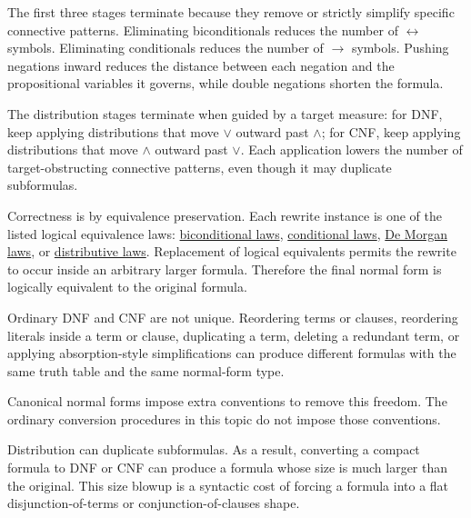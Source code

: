\begin{remark*}[Termination]
The first three stages terminate because they remove or strictly simplify
specific connective patterns. Eliminating biconditionals reduces the number of
\(\leftrightarrow\) symbols. Eliminating conditionals reduces the number of
\(\rightarrow\) symbols. Pushing negations inward reduces the distance between
each negation and the propositional variables it governs, while double
negations shorten the formula.

The distribution stages terminate when guided by a target measure: for DNF,
keep applying distributions that move \(\lor\) outward past \(\land\); for CNF,
keep applying distributions that move \(\land\) outward past \(\lor\). Each
application lowers the number of target-obstructing connective patterns, even
though it may duplicate subformulas.
\end{remark*}

\begin{remark*}[Correctness]
Correctness is by equivalence preservation. Each rewrite instance is one of the
listed logical equivalence laws:
\hyperref[thm:biconditional-equivalence-laws-propositional-logic]{biconditional laws},
\hyperref[thm:conditional-equivalence-laws-propositional-logic]{conditional laws},
\hyperref[thm:de-morgan-laws-propositional-logic]{De Morgan laws}, or
\hyperref[thm:distributive-laws-propositional-logic]{distributive laws}.
Replacement of logical equivalents permits the rewrite to occur inside an
arbitrary larger formula. Therefore the final normal form is logically
equivalent to the original formula.
\end{remark*}

\begin{remark*}
Ordinary DNF and CNF are not unique. Reordering terms or clauses, reordering
literals inside a term or clause, duplicating a term, deleting a redundant
term, or applying absorption-style simplifications can produce different
formulas with the same truth table and the same normal-form type.

Canonical normal forms impose extra conventions to remove this freedom. The
ordinary conversion procedures in this topic do not impose those conventions.
\end{remark*}

\begin{remark*}
Distribution can duplicate subformulas. As a result, converting a compact
formula to DNF or CNF can produce a formula whose size is much larger than the
original. This size blowup is a syntactic cost of forcing a formula into a
flat disjunction-of-terms or conjunction-of-clauses shape.
\end{remark*}

